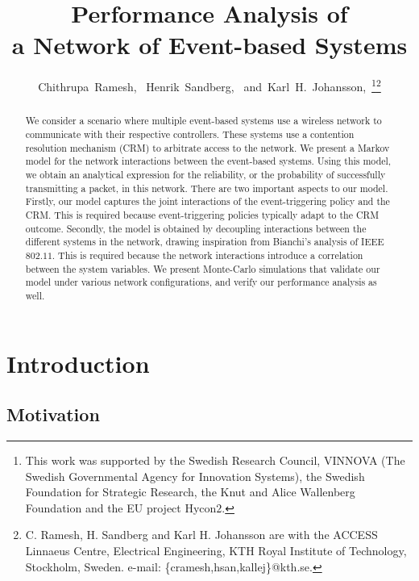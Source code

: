 \documentclass[journal]{IEEEtran}
\begin{document}
\title{Performance Analysis of \\
a Network of Event-based Systems}
\author{Chithrupa~Ramesh,~
        Henrik~Sandberg,~
        and~Karl~H.~Johansson,~\thanks{This work was supported by the Swedish Research Council,
        VINNOVA (The Swedish Governmental Agency for Innovation
        Systems), the Swedish Foundation for Strategic Research,
        the Knut and Alice Wallenberg Foundation and the EU
        project Hycon$2$.}\thanks{C. Ramesh, H. Sandberg and Karl H. Johansson are with the ACCESS Linnaeus Centre,
Electrical Engineering, KTH Royal Institute of Technology, Stockholm,
Sweden. e-mail: \{cramesh,hsan,kallej\}@kth.se.}}
\maketitle


\begin{abstract}

We consider a scenario where multiple event-based systems use a wireless network to communicate with their respective controllers. These systems use a contention resolution mechanism (CRM) to arbitrate access to the network. We present a Markov model for the network interactions between the event-based systems. Using this model, we obtain an analytical expression for the reliability, or the probability of successfully transmitting a packet, in this network. There are two important aspects to our model. Firstly, our model captures the joint interactions of the event-triggering policy and the CRM. This is required because event-triggering policies typically adapt to the CRM outcome. Secondly, the model is obtained by decoupling interactions between the different systems in the network, drawing inspiration from Bianchi's analysis of IEEE~$802.11$. This is required because the network interactions introduce a correlation between the system variables. We present Monte-Carlo simulations that validate our model under various network configurations, and verify our performance analysis as well.

\end{abstract}

\section{Introduction} \label{S:Intro}

\subsection{Motivation}
\end{document}
